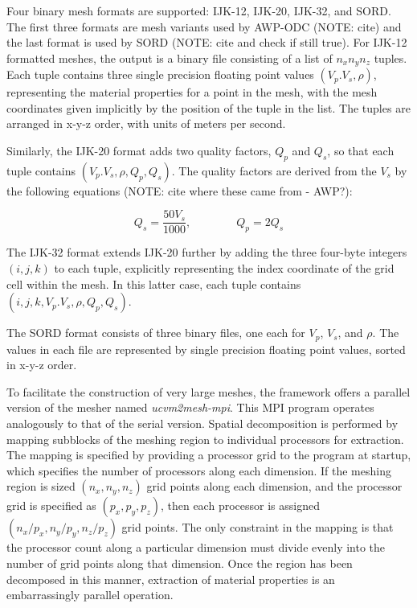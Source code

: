 Four binary mesh formats are supported: IJK-12, IJK-20, IJK-32, and SORD. The first three formats are mesh variants used by AWP-ODC (NOTE: cite) and the last format is used by SORD (NOTE: cite and check if still true). For IJK-12 formatted meshes, the output is a binary file consisting of a list of $n_xn_yn_z$ tuples. Each tuple contains three single precision floating point values $(V_p. V_s, \rho)$, representing the material properties for a point in the mesh, with the mesh coordinates given implicitly by the position of the tuple in the list. The tuples are arranged in x-y-z order, with units of meters per second. 

Similarly, the IJK-20 format adds two quality factors, $Q_p$ and $Q_s$, so that each tuple contains $(V_p. V_s, \rho, Q_p, Q_s)$. The quality factors are derived from the $V_s$ by the following equations (NOTE: cite where these came from - AWP?):

\begin{equation}
Q_s = \frac{50 V_s}{1000}, \qquad \qquad Q_p = 2 Q_s
\end{equation}

The IJK-32 format extends IJK-20 further by adding the three four-byte integers $(i,j,k)$ to each tuple, explicitly representing the index coordinate of the grid cell within the mesh. In this latter case, each tuple contains $(i, j, k, V_p. V_s, \rho, Q_p, Q_s)$.

The SORD format consists of three binary files, one each for $V_p$, $V_s$, and $\rho$. The values in each file are represented by single precision floating point values, sorted in x-y-z order. 

To facilitate the construction of very large meshes, the framework offers a parallel version of the mesher named \emph{ucvm2mesh-mpi}. This MPI program operates analogously to that of the serial version. Spatial decomposition is performed by mapping subblocks of the meshing region to individual processors for extraction. The mapping is specified by providing a processor grid to the program at startup, which specifies the number of processors along each dimension. If the meshing region is sized $(n_x, n_y, n_z)$ grid points along each dimension, and the processor grid is specified as $(p_x, p_y, p_z)$, then each processor is assigned $(n_x/p_x, n_y/p_y, n_z/p_z)$ grid points. The only constraint in the mapping is that the processor count along a particular dimension must divide evenly into the number of grid points along that dimension. Once the region has been decomposed in this manner, extraction of material properties is an embarrassingly parallel operation.  


